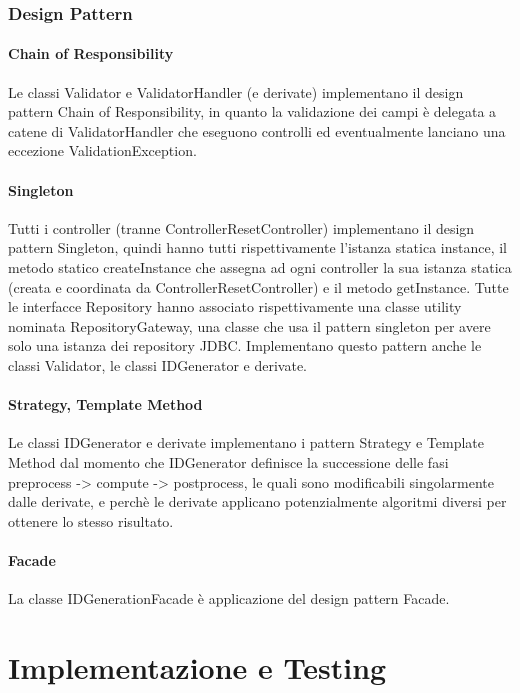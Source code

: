 \documentclass[a4paper,12pt]{report}
\begin{document}
		
		\subsection{Design Pattern}
			\subsubsection{Chain of Responsibility}
			Le classi Validator e ValidatorHandler (e derivate) implementano il design pattern Chain of Responsibility, in quanto la validazione dei campi è delegata a catene di ValidatorHandler che eseguono controlli ed eventualmente lanciano una eccezione ValidationException.
		
			\subsubsection{Singleton}	
			Tutti i controller (tranne ControllerResetController) implementano il design pattern Singleton, quindi hanno tutti rispettivamente l'istanza statica instance, il metodo statico createInstance che assegna ad ogni controller la sua istanza statica (creata e coordinata da ControllerResetController) e il metodo getInstance.
Tutte le interfacce Repository hanno associato rispettivamente una classe utility nominata RepositoryGateway, una classe che usa il pattern singleton per avere solo una istanza dei repository JDBC.
Implementano questo pattern anche le classi Validator, le classi IDGenerator e derivate. 
				
		\subsubsection{Strategy, Template Method}
		Le classi IDGenerator e derivate implementano i pattern Strategy e Template Method dal momento che IDGenerator definisce la successione delle fasi preprocess -> compute -> postprocess, le quali sono modificabili singolarmente dalle derivate, e perchè le derivate applicano potenzialmente algoritmi diversi per ottenere lo stesso risultato. 
		
		\subsubsection{Facade}		
		La classe IDGenerationFacade è applicazione del design pattern Facade.

      \chapter{Implementazione e Testing}
      
\end{document}
